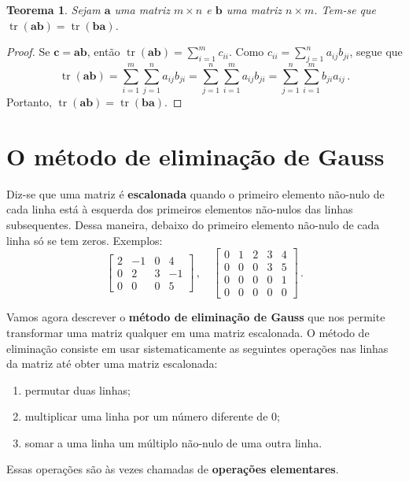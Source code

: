 \documentclass[12pt,a4paper]{report}
\newcommand{\tb}{\textbf}
\newcommand{\mb}{\mathbf}
\newtheorem{thm}{Teorema}[chapter]
\DeclareMathOperator{\tr}{tr}
\begin{document}
\begin{thm}
  Sejam $\mb a$ uma matriz $m\times n$ e $\mb b$ uma matriz $n\times m$. Tem-se que $\tr(\mb {ab})=\tr(\mb{ba})$.
\end{thm}
\begin{proof}
  Se $\mb c=\mb a\mb b$, então $\tr(\mb {ab})=\sum_{i=1}^m c_{ii}$. Como $c_{ii}=\sum_{j=1}^na_{ij}b_{ji}$, segue que
  $$\tr(\mb{ab})=\sum_{i=1}^m\sum_{j=1}^na_{ij}b_{ji}=\sum_{j=1}^n\sum_{i=1}^ma_{ij}b_{ji}=\sum_{j=1}^n\sum_{i=1}^mb_{ji}a_{ij}\,.$$
  Portanto, $\tr(\mb{ab})=\tr(\mb{ba})$.
\end{proof}

\chapter{O método de eliminação de Gauss}

Diz-se que uma matriz é \tb{escalonada} quando o primeiro elemento não-nulo de cada linha está à esquerda dos primeiros elementos não-nulos das linhas subsequentes. Dessa maneira, debaixo do primeiro elemento não-nulo de cada linha só se tem zeros. Exemplos:
$$\begin{bmatrix}
  2&-1&0&4\\
  0&2&3&-1\\
  0&0&0&5
\end{bmatrix}\,,\quad \begin{bmatrix}
  0&1&2&3&4\\
  0&0&0&3&5\\
  0&0&0&0&1\\
  0&0&0&0&0
\end{bmatrix}\,.$$

Vamos agora descrever o \tb{método de eliminação de Gauss} que nos permite transformar uma matriz qualquer em uma matriz escalonada. O método de eliminação consiste em usar sistematicamente as seguintes operações nas linhas da matriz até obter uma matriz escalonada:
\begin{enumerate}
  \item permutar duas linhas;
  \item multiplicar uma linha por um número diferente de $0$;
  \item somar a uma linha um múltiplo não-nulo de uma outra linha.
\end{enumerate}
Essas operações são às vezes chamadas de \tb{operações elementares}.
\end{document}
